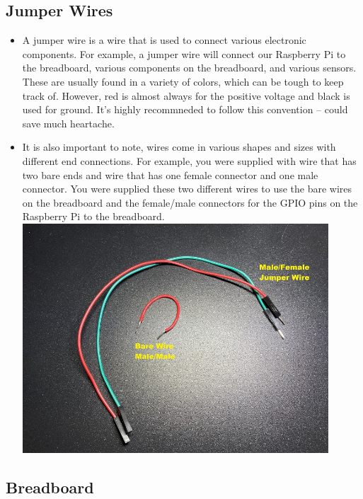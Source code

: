 \documentclass{article}\usepackage[]{graphicx}\usepackage[]{color}
\begin{document}
\subsection{Jumper Wires}

\begin{itemize}
\item A jumper wire is a wire that is used to connect various electronic components. For example, a jumper wire will connect our Raspberry Pi to the breadboard, various components on the breadboard, and various sensors. These are usually found in a variety of colors, which can be tough to keep track of. However, red is almost always for the positive voltage and black is used for ground. It's highly recommneded to follow this convention -- could save much heartache.
\item It is also important to note, wires come in various shapes and sizes with different end connections. For example, you were supplied with wire that has two bare ends and wire that has one female connector and one male connector. You were supplied these two different wires to use the bare wires on the breadboard and the female/male connectors for the GPIO pins on the Raspberry Pi to the breadboard.
\newline
\newline
\includegraphics[width=0.90\textwidth]{wires}
\end{itemize}

\subsection{Breadboard}
\end{document}
